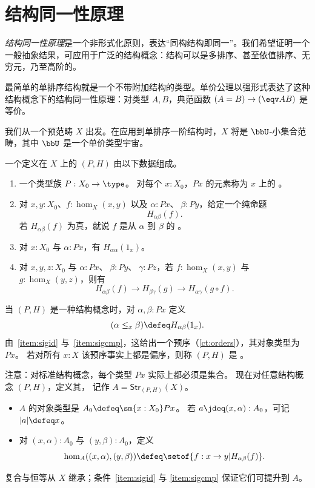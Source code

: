 \section{结构同一性原理}
\label{sec:sip}

\emph{结构同一性原理}是一个非形式化原则，表达“同构结构即同一”。我们希望证明一个一般抽象结果，可应用于广泛的结构概念：结构可以是多排序、甚至依值排序、无穷元，乃至高阶的。

最简单的单排序结构就是一个不带附加结构的类型。单价公理以强形式表达了这种结构概念下的结构同一性原理：对类型 $A,B$，典范函数 $(A=B)\to (\eqv A B)$ 是等价。

我们从一个预范畴 $X$ 出发。在应用到单排序一阶结构时，$X$ 将是 %
$\bbU$-小集合范畴，其中 $\bbU$ 是一个单价类型宇宙。

\begin{defn}\label{ct:sig}
  一个定义在 $X$ 上的
  $(P,H)$ 由以下数据组成。
  \begin{enumerate}
  \item 一个类型族 $P:X_0 \to \type$。
    对每个 $x:X_0$，$Px$ 的元素称为 $x$ 上的
    。
  \item 对 $x,y:X_0$、$f:\hom_X(x,y)$ 以及 $\alpha:Px$、$\;\beta:Py$，给定一个纯命题
  \[ H_{\alpha\beta}(f).\]
    若 $H_{\alpha\beta}(f)$ 为真，就说 $f$ 是从 $\alpha$ 到 $\beta$ 的
    。
  \item 对 $x:X_0$ 与 $\alpha:Px$，有 $H_{\alpha\alpha}(1_x)$。\label{item:sigid}
  \item 对 $x,y,z:X_0$ 与 $\alpha:Px$、$\;\beta:Py$、$\;\gamma:Pz$，若
$f:\hom_X(x,y)$ 与 $g:\hom_X(y,z)$，则有\label{item:sigcmp}
  \[ H_{\alpha\beta}(f)\to H_{\beta\gamma}(g)\to H_{\alpha\gamma}(g\circ   f).\]
   \end{enumerate}
  当 $(P,H)$ 是一种结构概念时，对 $\alpha,\beta:Px$ 定义
  \[ (\alpha\leq_x\beta) \defeq H_{\alpha\beta}(1_x).\]
  由~\ref{item:sigid} 与~\ref{item:sigcmp}，这给出一个预序（\cref{ct:orders}），其对象类型为 $Px$。
  若对所有 $x:X$ 该预序事实上都是偏序，则称 $(P,H)$ 是
  。
\end{defn}

注意：对标准结构概念，每个类型 $Px$ 实际上都必须是集合。
现在对任意结构概念 $(P,H)$，定义其，
%
%
记作 $A = \mathsf{Str}_{(P,H)}(X)$。
\begin{itemize}
\item $A$ 的对象类型是 $A_0 \defeq \sm{x:X_0} Px$。
  若 $a\jdeq (x,\alpha):A_0$，可记 $|a| \defeq x$。
\item 对 $(x,\alpha):A_0$ 与 $(y,\beta):A_0$，定义
  \[\hom_A((x,\alpha),(y,\beta)) \defeq \setof{ f:x \to y | H_{\alpha\beta}(f)}.\]
\end{itemize}
复合与恒等从 $X$ 继承；条件~\ref{item:sigid} 与 \ref{item:sigcmp} 保证它们可提升到 $A$。

